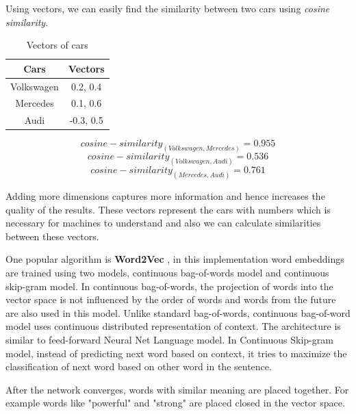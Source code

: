 Using vectors, we can easily find the similarity between two cars using \textit{cosine similarity}.

\begin{table}[!ht]
\centering
\begin{tabular}{cc}
\hline
\textbf{Cars} & \textbf{Vectors} \\ \hline
Volkswagen    & 0.2, 0.4         \\ \hline
Mercedes      & 0.1, 0.6         \\ \hline
Audi          & -0.3, 0.5        \\ \hline
\end{tabular}
\caption{Vectors of cars}
\captionsetup{justification=centering,margin=2cm}
\label{my-label}
\end{table}

\begin{equation}
        cosine-similarity_{(Volkswagen, Mercedes)} = 0.955 
\end{equation}
\begin{equation}
    cosine-similarity_{(Volkswagen, Audi)} = 0.536
\end{equation}
\begin{equation}
    cosine-similarity_{(Mercedes, Audi)} = 0.761
\end{equation}

Adding more dimensions captures more information and hence increases the quality of the results. These vectors represent the cars with numbers which is necessary for machines to understand and also we can calculate similarities between these vectors. 

One popular algorithm is \textbf{Word2Vec} \cite{mikolov2013efficient}, in this implementation word embeddings are trained using two models, continuous bag-of-words model and continuous skip-gram model. In continuous bag-of-words, the projection of words into the vector space is not influenced by the order of words and words from the future are also used in this model. Unlike standard bag-of-words, continuous bag-of-word model uses continuous distributed representation of context. The architecture is similar to feed-forward Neural Net Language model. In Continuous Skip-gram model, instead of predicting next word based on context, it tries to maximize the classification of next word based on other word in the sentence.

After the network converges, words with similar meaning are placed together. For example words like "powerful" and "strong" are placed closed in the vector space. 


